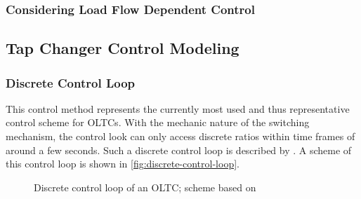 
\subsubsection{Considering Load Flow Dependent Control}


\subsection{Tap Changer Control Modeling}


\subsubsection{Discrete Control Loop}
This control method represents the currently most used and thus representative control scheme for \acsp{OLTC}. With the mechanic nature of the switching mechanism, the control look can only access discrete ratios within time frames of around a few seconds. Such a discrete control loop is described by \textcite{milanoHybridControlModel2011,milanoPowerSystemModelling2010}. A scheme of this control loop is shown in \autoref{fig:discrete-control-loop}.

\begin{figure}[htb!]
        \centering
        \caption{Discrete control loop of an \acs{OLTC}; scheme based on \textcite{milanoHybridControlModel2011}}
        \label{fig:discrete-control-loop}
\end{figure}

